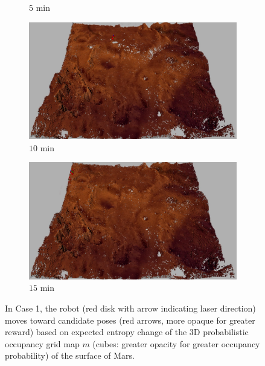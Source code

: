 \documentclass[conf]{new-aiaa}
\begin{document}
\begin{figure}[!t]
\begin{subfigure}[t]{0.49\columnwidth}
        		\caption{$5$ min}
		\vspace*{0.025\textwidth}
    	\end{subfigure}
	\centering
	\begin{subfigure}[t]{0.49\columnwidth}
           	\centering
          	\includegraphics[height=0.5\textwidth]{FullMarsMap10min.jpg}
        		\caption{$10$ min}
		\vspace*{0.025\textwidth}
    	\end{subfigure}
    	\begin{subfigure}[t]{0.49\columnwidth}
           	\centering
          	\includegraphics[height=0.5\textwidth]{FullMarsMap15min.jpg}
        		\caption{$15$ min}
		\vspace*{0.025\textwidth}
    	\end{subfigure}
\caption{In Case 1, the robot (red disk with arrow indicating laser direction) moves toward candidate poses (red arrows, more opaque for greater reward) based on expected entropy change of the 3D probabilistic occupancy grid map $m$ (cubes: greater opacity for greater occupancy probability) of the surface of Mars.}
\label{fig:mars3DogmCase1}
\end{figure}
\end{document}
